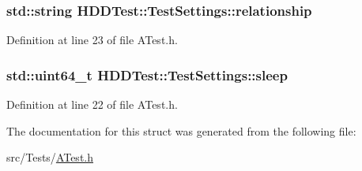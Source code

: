 \hypertarget{struct_h_d_d_test_1_1_test_settings_a2ae4bf77f3d9d63cc28ac44622327d23}{
\subsubsection[{relationship}]{\setlength{\rightskip}{0pt plus 5cm}std\-::string H\-D\-D\-Test\-::\-Test\-Settings\-::relationship}}\label{struct_h_d_d_test_1_1_test_settings_a2ae4bf77f3d9d63cc28ac44622327d23}


Definition at line 23 of file A\-Test.\-h.

\hypertarget{struct_h_d_d_test_1_1_test_settings_a689e6ed46e39f14544a7f257c506d9b9}{
\subsubsection[{sleep}]{\setlength{\rightskip}{0pt plus 5cm}std\-::uint64\-\_\-t H\-D\-D\-Test\-::\-Test\-Settings\-::sleep}}\label{struct_h_d_d_test_1_1_test_settings_a689e6ed46e39f14544a7f257c506d9b9}


Definition at line 22 of file A\-Test.\-h.



The documentation for this struct was generated from the following file\-:\begin{DoxyCompactItemize}
\item 
src/\-Tests/\hyperlink{_a_test_8h}{A\-Test.\-h}\end{DoxyCompactItemize}
